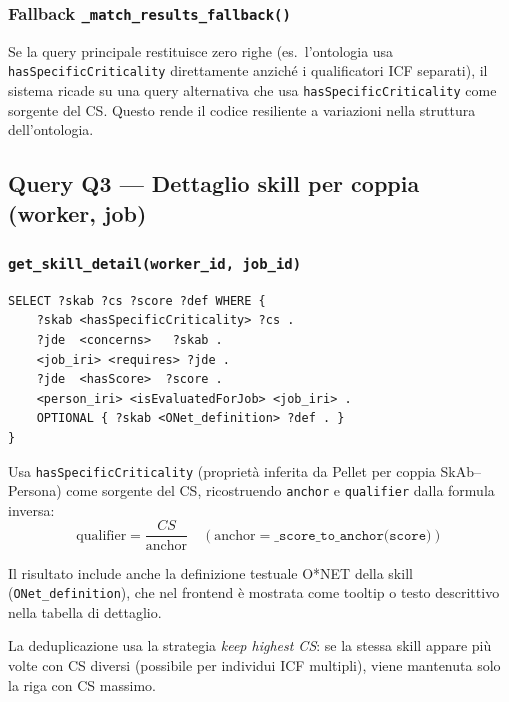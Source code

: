 \documentclass[a4paper,12pt]{article}
\begin{document}
\subsubsection{Fallback {\small\texttt{\_match\_results\-\_fallback()}}}

Se la query principale restituisce zero righe (es.\ l'ontologia usa
\texttt{hasSpecificCriticality} direttamente anzich\'{e} i qualificatori
ICF separati), il sistema ricade su una query alternativa che usa
\texttt{hasSpecificCriticality} come sorgente del CS. Questo rende il
codice resiliente a variazioni nella struttura dell'ontologia.

\subsection{Query Q3 --- Dettaglio skill per coppia (worker, job)}

\subsubsection{\texttt{get\_\allowbreak{}skill\_\allowbreak{}detail(worker\_\allowbreak{}id, job\_\allowbreak{}id)}}

\begin{lstlisting}[caption={SPARQL Q3 per il dettaglio skill.}]
SELECT ?skab ?cs ?score ?def WHERE {
    ?skab <hasSpecificCriticality> ?cs .
    ?jde  <concerns>   ?skab .
    <job_iri> <requires> ?jde .
    ?jde  <hasScore>  ?score .
    <person_iri> <isEvaluatedForJob> <job_iri> .
    OPTIONAL { ?skab <ONet_definition> ?def . }
}
\end{lstlisting}

\noindent Usa \texttt{hasSpecificCriticality} (propriet\`{a} inferita da Pellet
per coppia SkAb--Persona) come sorgente del CS, ricostruendo
\texttt{anchor} e \texttt{qualifier} dalla formula inversa:
\[
\text{qualifier} = \frac{CS}{\text{anchor}} \quad
(\text{anchor} = \texttt{\_score\_to\_anchor(score)})
\]

Il risultato include anche la definizione testuale O*NET della skill
(\texttt{ONet\_definition}), che nel frontend \`{e} mostrata come tooltip
o testo descrittivo nella tabella di dettaglio.

La deduplicazione usa la strategia \textit{keep highest CS}: se la stessa
skill appare pi\`{u} volte con CS diversi (possibile per individui ICF
multipli), viene mantenuta solo la riga con CS massimo.
\end{document}
